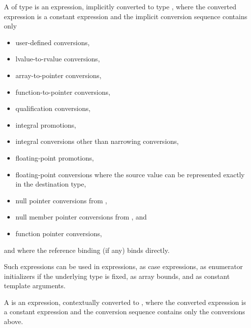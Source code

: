 \pnum
A 
of type  is an
expression, implicitly converted to type , where
the converted expression is a constant expression and the
implicit conversion sequence contains only
\begin{itemize}
\item user-defined conversions,
\item lvalue-to-rvalue conversions,
\item array-to-pointer conversions,
\item function-to-pointer conversions,
\item qualification conversions,
\item integral promotions,
\item integral conversions other than narrowing conversions,
\item floating-point promotions,
\item floating-point conversions where
  the source value can be represented exactly in the destination type,
\item null pointer conversions from ,
\item null member pointer conversions from , and
\item function pointer conversions,
\end{itemize}
and where the reference binding (if any) binds directly.
\begin{note}
Such expressions can be used in 
expressions, as case expressions,
as enumerator initializers if the underlying type is
fixed, as array bounds, and
as constant template
arguments.
\end{note}
%
%
A  is
an expression, contextually converted to ,
where the converted expression is a constant expression and
the conversion sequence contains only the conversions above.

